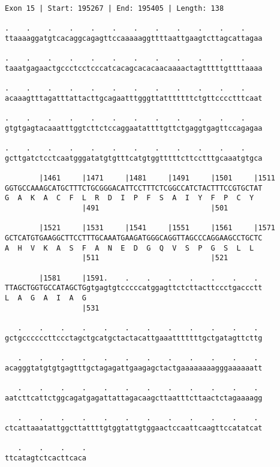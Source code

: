 \documentclass{article}
\begin{document}
\newpage
\begin{Verbatim}
Exon 15 | Start: 195267 | End: 195405 | Length: 138
 
.    .    .    .    .    .    .    .    .    .    .    .    
ttaaaaggatgtcacaggcagagttccaaaaaggttttaattgaagtcttagcattagaa
  
.    .    .    .    .    .    .    .    .    .    .    .    
taaatgagaactgccctcctcccatcacagcacacaacaaaactagtttttgttttaaaa
  
.    .    .    .    .    .    .    .    .    .    .    .    
acaaagtttagatttattacttgcagaatttgggttatttttttctgttcccctttcaat
  
.    .    .    .    .    .    .    .    .    .    .    .    
gtgtgagtacaaatttggtcttctccaggaatattttgttctgaggtgagttccagagaa
  
.    .    .    .    .    .    .    .    .    .    .    .    
gcttgatctcctcaatgggatatgtgtttcatgtggtttttcttcctttgcaaatgtgca
  
        |1461     |1471     |1481     |1491     |1501     |1511
GGTGCCAAAGCATGCTTTCTGCGGGACATTCCTTTCTCGGCCATCTACTTTCCGTGCTAT
G  A  K  A  C  F  L  R  D  I  P  F  S  A  I  Y  F  P  C  Y  
                  |491                          |501        
  
        |1521     |1531     |1541     |1551     |1561     |1571
GCTCATGTGAAGGCTTCCTTTGCAAATGAAGATGGGCAGGTTAGCCCAGGAAGCCTGCTC
A  H  V  K  A  S  F  A  N  E  D  G  Q  V  S  P  G  S  L  L  
                  |511                          |521        
  
        |1581     |1591.    .    .    .    .    .    .    . 
TTAGCTGGTGCCATAGCTGgtgagtgtcccccatggagttctcttacttccctgaccctt
L  A  G  A  I  A  G                                         
                  |531                                      
  
   .    .    .    .    .    .    .    .    .    .    .    . 
gctgccccccttccctagctgcatgctactacattgaaatttttttgctgatagttcttg
  
   .    .    .    .    .    .    .    .    .    .    .    . 
acagggtatgtgtgagtttgctagagattgaagagctactgaaaaaaaagggaaaaaatt
  
   .    .    .    .    .    .    .    .    .    .    .    . 
aatcttcattctggcagatgagattattagacaagcttaatttcttaactctagaaaagg
  
   .    .    .    .    .    .    .    .    .    .    .    . 
ctcattaaatattggcttattttgtggtattgtggaactccaattcaagttccatatcat
  
   .    .    .    .
ttcatagtctcacttcaca
\end{Verbatim}
\end{document}
